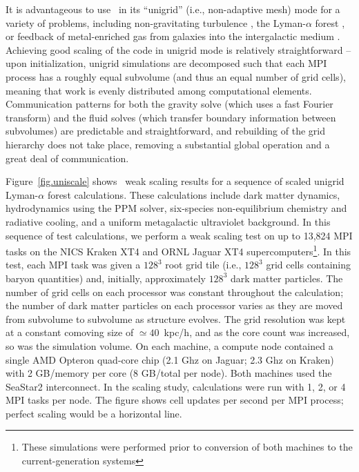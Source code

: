 It is advantageous to use \enzo\ in its ``unigrid'' (i.e.,
non-adaptive mesh) mode for a variety of problems, including
non-gravitating turbulence
\citep[e.g.,][]{2002ApJ...569L.127K,Kritsuk04, 2007ApJ...665..416K,
2009ASPC..406...15K}, the Lyman-$\alpha$ forest
\citep{2005MNRAS.361...70J,2009MNRAS.399.1934P}, or feedback of
metal-enriched gas from galaxies into the intergalactic medium
\citep{2004ApJ...601L.115N,2011ApJ...731....6S}.  Achieving good
scaling of the code in unigrid mode is relatively straightforward --
upon initialization, unigrid simulations are decomposed such that each
MPI process has a roughly equal subvolume (and thus an equal number of grid
cells), meaning that work is evenly distributed among computational elements.  Communication
patterns for both the gravity solve (which uses a fast Fourier
transform) and the fluid solves (which transfer boundary information
between subvolumes) are predictable and straightforward, and
rebuilding of the grid hierarchy does not take place, removing a
substantial global operation and a great deal of communication.

Figure~\ref{fig.uniscale} shows \enzo\ weak scaling results for a
sequence of scaled unigrid Lyman-$\alpha$ forest calculations. These
calculations include dark matter dynamics, hydrodynamics using the
PPM solver, six-species non-equilibrium chemistry and
radiative cooling, and a uniform metagalactic ultraviolet background.
In this sequence of test calculations, we perform a weak scaling test
on up to 13,824 MPI tasks on the NICS Kraken XT4 and ORNL Jaguar XT4
supercomputers\footnote{These simulations were performed prior to
conversion of both machines to the current-generation systems}.  In
this test, each MPI task was given a $128^3$ root grid tile (i.e.,
$128^3$ grid cells containing baryon quantities) and, initially,
approximately $128^3$ dark matter particles.  The number of grid cells
on each processor 
was constant throughout the calculation; the number of dark matter
particles on each processor varies as they are moved from subvolume to subvolume as
structure evolves.  The grid resolution was kept at a constant
comoving size of $\simeq 40$~kpc/h, and as the core count was
increased, so was the simulation volume.  On each machine, a compute
node contained a single AMD Opteron quad-core chip (2.1 Ghz on Jaguar;
2.3 Ghz on Kraken) with 2 GB/memory per core (8 GB/total per node).
Both machines used the SeaStar2 interconnect.  In the scaling study,
calculations were run with 1, 2, or 4 MPI tasks per node.  The figure
shows cell updates per second per MPI process; perfect scaling would
be a horizontal line.

